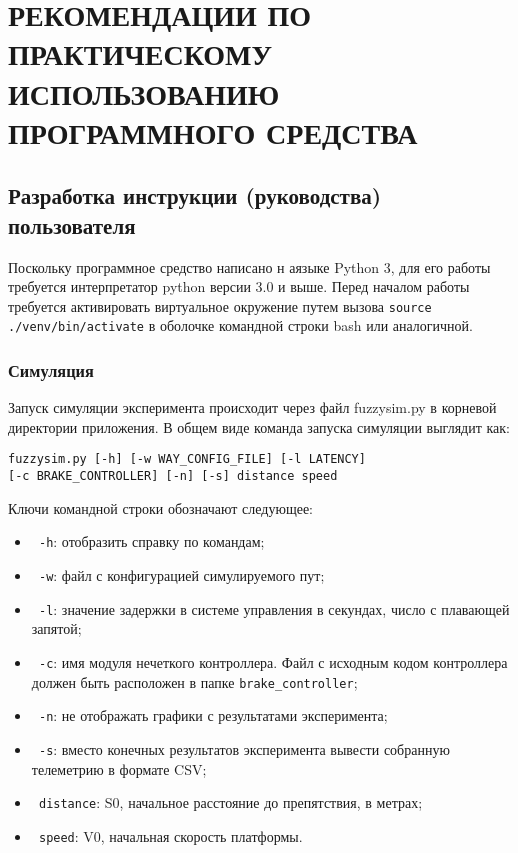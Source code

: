 \lstset{style=pythoninlinestyle}

\section{РЕКОМЕНДАЦИИ ПО ПРАКТИЧЕСКОМУ ИСПОЛЬЗОВАНИЮ ПРОГРАММНОГО СРЕДСТВА}
\label{sec:manual}

\subsection{Разработка инструкции (руководства) пользователя}
\label{sub:manual:1}

Поскольку программное средство написано н аязыке Python 3, для его работы требуется интерпретатор python версии 3.0 и выше. Перед началом работы  требуется активировать виртуальное окружение путем вызова \lstinline!source ./venv/bin/activate! в оболочке командной строки bash или аналогичной.

\subsubsection{Симуляция }

Запуск симуляции эксперимента происходит через файл fuzzysim.py в корневой директории приложения. В общем виде команда запуска симуляции выглядит как:

\begin{lstlisting}[style=pythonstyle,caption={  }, label=lst:func:1]
  fuzzysim.py [-h] [-w WAY_CONFIG_FILE] [-l LATENCY]                   [-c BRAKE_CONTROLLER] [-n] [-s] distance speed
\end{lstlisting}

Ключи командной строки обозначают следующее:

\begin{itemize}
	\item \lstinline! -h!: отобразить справку по командам;
	\item \lstinline! -w!: файл с конфигурацией симулируемого пут;
	\item \lstinline! -l!: значение задержки в системе управления в секундах, число с плавающей запятой;
	\item \lstinline! -c!: имя модуля нечеткого контроллера. Файл с исходным кодом контроллера должен быть расположен в папке \lstinline!brake_controller!;
	\item \lstinline! -n!: не отображать графики с результатами эксперимента;
	\item \lstinline! -s!: вместо конечных результатов эксперимента вывести собранную телеметрию в формате CSV;
	\item \lstinline! distance!: S0, начальное расстояние до препятствия, в метрах;
	\item \lstinline! speed!: V0, начальная скорость платформы.
\end{itemize}

